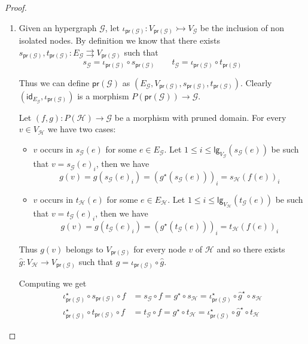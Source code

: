 \documentclass[3p]{elsarticle}
\newcommand{\lgh}{\mathsf{lg}}
\newcommand{\pr}{\mathsf{pr}}
\newcommand{\mto}{\rightarrowtail}
\newcommand{\id}[1]{\mathsf{id}_{#1}}
\theoremstyle{remark}
\theoremstyle{definition}
\begin{document}
\dx*
\begin{proof}\label{proof:dx}
	\begin{enumerate}
\item Given an hypergraph $\mathcal{G}$, let $\iota_{\pr(\mathcal{G})}\colon V_{\pr(\mathcal{G})}\mto V_{\mathcal{G}}$ be the inclusion of non isolated nodes. By definition we know that there exists $s_{\pr(\mathcal{G})}, t_{\pr(\mathcal{G})}\colon E_{\mathcal{G}}\rightrightarrows V_{\pr(\mathcal{G})}$ such that
\[s_{\mathcal{G}}=\iota_{\pr(\mathcal{G})}\circ s_{\pr(\mathcal{G})}\qquad t_{\mathcal{G}}=\iota_{\pr(\mathcal{G})}\circ t_{\pr(\mathcal{G})}\]
 
 Thus we can define $\pr(\mathcal{G})$ as $(E_{\mathcal{G}}, V_{\pr(\mathcal{G})}, s_{\pr(\mathcal{G})}, t_{\pr(\mathcal{G})})$. Clearly $(\id{E_{\mathcal{G}}}, \iota_{\pr(\mathcal{G})})$ is a morphism $P(\pr(\mathcal{G}))\to \mathcal{G}$.
 
 Let $(f,g)\colon P(\mathcal{H})\to \mathcal{G}$ be a morphism with pruned domain. For every $v \in V_{\mathcal{H}}$ we have two cases:
 \begin{itemize}
 	\item $v$ occurs in $s_{\mathcal{G}}(e)$ for some $e\in E_{\mathcal{G}}$. Let $1\leq i\leq \lgh_{V_{\mathcal{G}}}(s_{\mathcal{G}}(e))$ be such that $v=s_{\mathcal{G}}(e)_i$, then we have
 	\[g(v)=g(s_{\mathcal{G}}(e)_i)=(g^\star(s_{\mathcal{G}}(e)))_i=s_{\mathcal{H}}(f(e))_i\]
 	\item $v$ occurs in $t_{\mathcal{H}}(e)$ for some $e\in E_{\mathcal{H}}$. Let $1\leq i\leq \lgh_{V_{\mathcal{H}}}(t_{\mathcal{G}}(e))$ be such that $v=t_{\mathcal{G}}(e)_i$, then we have
 	\[g(v)=g(t_{\mathcal{G}}(e)_i)=(g^\star(t_{\mathcal{G}}(e)))_i=t_{\mathcal{H}}(f(e))_i\]
 \end{itemize}
 
 Thus $g(v)$ belongs to $V_{\pr(\mathcal{G})}$ for every node $v$ of $\mathcal{H}$ and so there exists $\hat{g}\colon V_{\mathcal{H}}\to V_{\pr(\mathcal{G})}$ such that $g=\iota_{\pr(\mathcal{G})}\circ \hat{g}$. 
 
 Computing we get
 \begin{align*}
 	\iota^\star_{\pr(\mathcal{G})}\circ s_{\pr(\mathcal{G})}\circ f &= s_{\mathcal{G}}\circ f = g^\star \circ s_{\mathcal{H}} = \iota^\star_{\pr(\mathcal{G})} \circ \hat{g}^\star \circ s_{\mathcal{H}} \\
 	\iota^\star_{\pr(\mathcal{G})}\circ t_{\pr(\mathcal{G})}\circ f &= t_{\mathcal{G}}\circ f = g^\star \circ t_{\mathcal{H}} = \iota^\star_{\pr(\mathcal{G})} \circ \hat{g}^\star \circ t_{\mathcal{H}}
 \end{align*}
 

\end{enumerate}
\end{proof}
\end{document}

